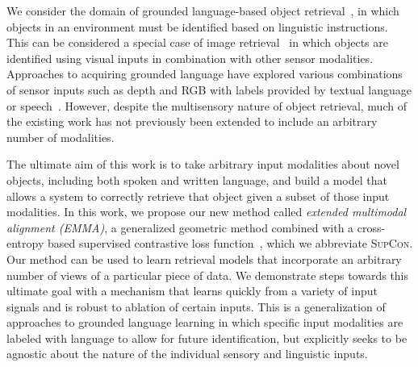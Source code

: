 \documentclass[10pt]{article} %
\newcommand{\ours}{\textsc{EMMA}}
\newcommand{\supcon}{\textsc{SupCon}}
\begin{document}
We consider the domain of grounded language-based object retrieval~\citep{hu2016natural, triplet_loss_2021_CVPR}, in which objects in an environment must be identified based on linguistic instructions. This can be considered a special case of image retrieval~\citep{huang2017deep, ma2020large, novak2015large, vo2019composing} in which objects are identified using visual inputs in combination with other sensor modalities. Approaches to acquiring grounded language have explored various combinations of sensor inputs such as depth and RGB with labels provided by textual language or  speech~\citep{RichardsDarvishMatuszekCategoryFree20}. 
However, despite the multisensory nature of object retrieval, much of the existing work has not previously been extended to include an arbitrary number of modalities. 


The ultimate aim of this work is to take arbitrary input modalities about novel objects, including both spoken and written language, and build a model that allows a system to correctly retrieve that object given a subset of those input modalities. In this work, we propose our new method called \textit{extended multimodal alignment (\ours{})}, a generalized geometric method combined with a cross-entropy based supervised contrastive loss function~\cite{NEURIPS2020_supervised_contrastive}, which we abbreviate \supcon{}. Our method can be used to learn retrieval models that incorporate an arbitrary number of views of a particular piece of data. We demonstrate steps towards this ultimate goal with a mechanism that learns quickly from a variety of input signals and is robust to ablation of certain inputs. This is a generalization of approaches to grounded language learning in which specific input modalities are labeled with language to allow for future identification, but explicitly seeks to be agnostic about the nature of the individual sensory and linguistic inputs. 
\end{document}
